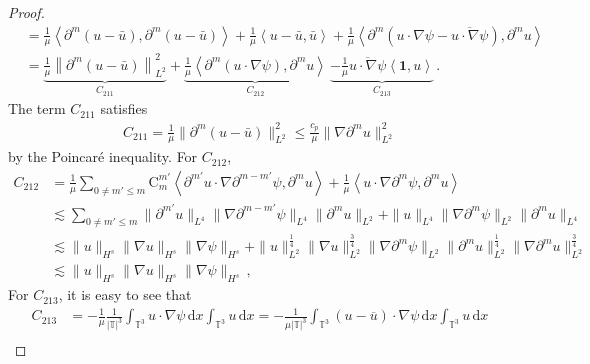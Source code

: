 \documentclass[reqno,11pt]{amsart}
\numberwithin{equation}{section}
\def\d{\mathrm{d}}
\begin{document}
\begin{proof}
\begin{align*}
&= \frac{1}{\mu} \left\langle \partial^m (u - \bar{u}), \partial^m (u - \bar{u}) \right\rangle + \frac{1}{\mu} \left\langle u - \bar{u}, \bar{u} \right\rangle + \frac{1}{\mu} \left\langle \partial^m \left( u \cdot \nabla \psi - \overline{u \cdot \nabla \psi} \right), \partial^m u \right\rangle \\
&= \underbrace{\frac{1}{\mu} \left\| \partial^m (u - \bar{u}) \right\|^2_{L^2}}_{{C}_{211}} + \underbrace{\frac{1}{\mu} \left\langle \partial^m (u \cdot \nabla \psi), \partial^m u \right\rangle}_{{C}_{212}} \ \underbrace{ - \frac{1}{\mu}\overline{u \cdot \nabla \psi} \left\langle \mathbf{1}, u \right\rangle}_{{C}_{213}} \,.
\end{align*}
The term $C_{211}$ satisfies
\begin{equation*}
\begin{aligned}
C_{211}= \frac{1}{\mu}\| \partial^m ( u-\bar{u}) \|^2_{L^2}\leq \frac{c_p}{\mu}\|\nabla \partial^m u\|^2_{L^2} 
\end{aligned}
\end{equation*}
by the Poincar\'e inequality. For $C_{212}$,
\begin{equation*}
\begin{aligned}
C_{212}&= \frac{1}{\mu} \sum_{0 \neq m' \leq m} \mathrm{C}_m^{m'} \left\langle \partial^{m'} u \cdot \nabla \partial^{m - m'} \psi, \partial^m u \right\rangle + \frac{1}{\mu} \left\langle u \cdot \nabla \partial^m \psi, \partial^m u \right\rangle \\
&\lesssim \sum_{0 \neq m' \leq m} \|\partial^{m'} u\|_{L^4} \|\nabla \partial^{m - m'} \psi\|_{L^4} \|\partial^m u\|_{L^2} + \|u\|_{L^4} \|\nabla \partial^m \psi\|_{L^2} \|\partial^m u\|_{L^4} \\
&\lesssim \|u\|_{H^s} \|\nabla u\|_{H^s} \|\nabla \psi\|_{H^s} + \|u\|_{L^2}^{\frac{1}{4}} \|\nabla u\|_{L^2}^{\frac{3}{4}} \|\nabla \partial^m \psi\|_{L^2} \|\partial^m u\|_{L^2}^{\frac{1}{4}} \|\nabla\partial^m u\|_{L^2}^{\frac{3}{4}} \\
&\lesssim \|u\|_{H^s} \|\nabla u\|_{H^s} \|\nabla \psi\|_{H^s} \,,
\end{aligned}
\end{equation*}
For $C_{213}$, it is easy to see that
\begin{equation*}
\begin{aligned}
C_{213}&=-\frac{1}{\mu} \frac{1}{|\mathbb{T}|^3} \int_{\mathbb{T}^3} u \cdot \nabla \psi \, \d x \int_{\mathbb{T}^3} u \, \d x = -\frac{1}{\mu |\mathbb{T}|^3} \int_{\mathbb{T}^3} (u - \overline{u})\cdot \nabla \psi \, \d x \int_{\mathbb{T}^3} u \, \d x \\

\end{aligned}
\end{equation*}
\end{proof}
\end{document}

